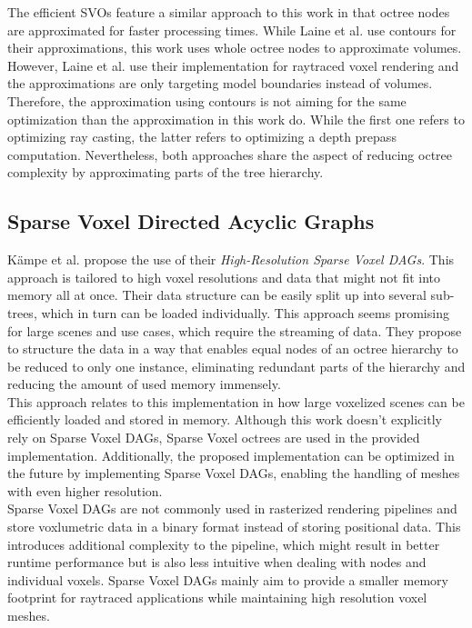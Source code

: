 \noindent
The efficient \ac{SVO}s feature a similar approach to this work in that octree nodes are approximated for faster 
processing times. While Laine et al. use contours for their approximations, this work uses whole octree nodes 
to approximate volumes. \\

\noindent
However, Laine et al. use their implementation for raytraced voxel rendering and the approximations are only 
targeting model boundaries instead of volumes. Therefore, the approximation using contours is not aiming for the 
same optimization than the approximation in this work do. While the first one refers to optimizing ray casting, 
the latter refers to optimizing a depth prepass computation. Nevertheless, both approaches share the aspect of 
reducing octree complexity by approximating parts of the tree hierarchy.


\subsection*{Sparse Voxel Directed Acyclic Graphs}

Kämpe et al. \cite{Kampe2013} propose the use of their \emph{High-Resolution Sparse Voxel \ac{DAG}s}. This approach 
is tailored to high voxel resolutions and data that might not fit into memory all at once. Their data structure can 
be easily split up into several sub-trees, which in turn can be loaded individually. This approach seems promising 
for large scenes and use cases, which require the streaming of data. They propose to structure the data in a way that 
enables equal nodes of an octree hierarchy to be reduced to only one instance, eliminating redundant parts of the 
hierarchy and reducing the amount of used memory immensely. \\

\noindent
This approach relates to this implementation in how large voxelized scenes can be efficiently loaded and stored in 
memory. Although this work doesn't explicitly rely on Sparse Voxel \ac{DAG}s, Sparse Voxel octrees are used in the 
provided implementation. Additionally, the proposed implementation can be optimized in the future by implementing 
Sparse Voxel \ac{DAG}s, enabling the handling of meshes with even higher resolution. \\

\noindent
Sparse Voxel \ac{DAG}s are not commonly used in rasterized rendering pipelines and store voxlumetric data in a binary 
format instead of storing positional data. This introduces additional complexity to the pipeline, which might result in 
better runtime performance but is also less intuitive when dealing with nodes and individual voxels. Sparse Voxel 
\ac{DAG}s mainly aim to provide a smaller memory footprint for raytraced applications while maintaining high resolution 
voxel meshes. \\

